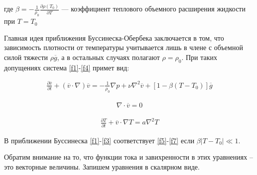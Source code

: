 \documentclass[a4paper, 12pt]{article}
\begin{document}
    где $\beta = - \frac{1}{\rho_0} \frac{\partial \rho(T_0)}{\partial T}$ --- коэффициент теплового объемного расширения жидкости при $T=T_0$

    Главная идея приближения Буссинеска-Обербека заключается в том, что зависимость плотности от температуры учитывается лишь в члене с объемной силой тяжести $\rho \overline g$, а в остальных случаях полагают $\rho = \rho_0$. При таких допущениях система \eqref{f1}-\eqref{f4} примет вид:

    \begin{equation}
    \begin{gathered}
    \label{f5}
    \frac{\partial \overline v}{\partial t} + (\overline v \cdot \nabla)\overline v = -\frac{1}{\rho_0}\nabla p + \nu \nabla^2 \overline v + [1-\beta(T-T_0)]\overline g
    \end{gathered}
    \end{equation}

    \begin{equation}
    \begin{gathered}
    \label{f6}
    \nabla \cdot \overline v = 0
    \end{gathered}
    \end{equation}

    \begin{equation}
    \begin{gathered}
    \label{f7}
    \frac{\partial T}{\partial t} + \overline v \cdot \nabla T = a \nabla^2 T
    \end{gathered}
    \end{equation}

    В приближении Буссинеска \eqref{f1}-\eqref{f3} соответствует \eqref{f5}-\eqref{f7} если ${\beta |T-T_0| \ll 1}$.

    Обратим внимание на то, что функции тока и завихренности в этих уравнениях – это векторные величины. Запишем уравнения в скалярном виде.
\end{document}
